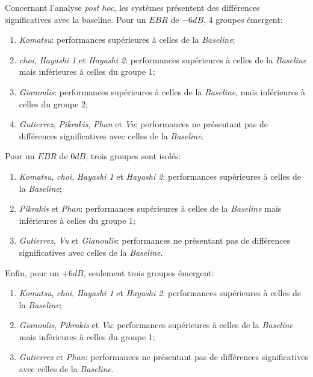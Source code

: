 Concernant l'analyse \emph{post hoc},  les systèmes présentent des différences significatives avec la baseline. Pour un $EBR$ de $-6dB$, 4 groupes émergent:

\begin{enumerate}
\item \emph{Komatsu}: performances supérieures à celles de la \emph{Baseline};
\item \emph{choi}, \emph{Hayashi 1} et \emph{Hayashi 2}: performances supérieures à celles de la \emph{Baseline} mais inférieures à celles du groupe 1;
\item \emph{Gianoulis}: performances supérieures à celles de la \emph{Baseline}, mais inférieures à celles du groupe 2;
\item \emph{Gutierrez}, \emph{Pikrakis}, \emph{Phan} et \emph{Vu}: performances ne présentant pas de différences significatives avec celles de la \emph{Baseline}.
\end{enumerate}

Pour un $EBR$ de $0dB$, trois groupes sont isolés: 

\begin{enumerate}
\item \emph{Komatsu}, \emph{choi}, \emph{Hayashi 1} et \emph{Hayashi 2}: performances supérieures à celles de la \emph{Baseline};
\item \emph{Pikrakis} et \emph{Phan}: performances supérieures à celles de la \emph{Baseline} mais inférieures à celles du groupe 1;
\item \emph{Gutierrez}, \emph{Vu} et \emph{Gianoulis}: performances ne présentant pas de différences significatives avec celles de la \emph{Baseline}.
\end{enumerate}

Enfin, pour un $+6dB$, seulement trois groupes émergent:

\begin{enumerate}
\item \emph{Komatsu}, \emph{choi}, \emph{Hayashi 1} et \emph{Hayashi 2}: performances supérieures à celles de la \emph{Baseline};
\item \emph{Gianoulis}, \emph{Pikrakis} et \emph{Vu}: performances supérieures à celles de la \emph{Baseline} mais inférieures à celles du groupe 1;
\item \emph{Gutierrez} et \emph{Phan}: performances ne présentant pas de différences significatives avec celles de la \emph{Baseline}.
\end{enumerate}

